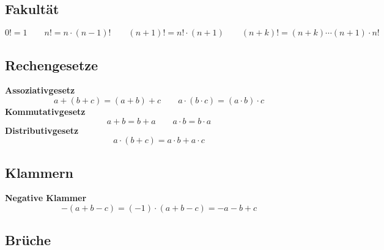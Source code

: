 \documentclass[../zusammenfassung_AN.tex]{subfiles}
\begin{document}
	
	\subsection{Fakultät}
	
	\begin{tcolorbox}[formelbox]
		\[
		0! = 1 \qquad
		n! = n\cdot(n-1)! \qquad
		(n+1)! = n!\cdot(n+1) \qquad
		(n+k)! = (n+k)\cdots(n+1)\cdot n!
		\]
	\end{tcolorbox}
	
	\subsection{Rechengesetze}
	
	\begin{tcolorbox}[dglbox, title={Grundgesetze der Arithmetik}]
		\textbf{Assoziativgesetz}
		\[
		a+(b+c) = (a+b)+c \qquad a\cdot(b\cdot c) = (a\cdot b)\cdot c
		\]
		\textbf{Kommutativgesetz}
		\[
		a+b = b+a \qquad a\cdot b = b\cdot a
		\]
		\textbf{Distributivgesetz}
		\[
		a\cdot(b+c) = a\cdot b + a\cdot c
		\]
	\end{tcolorbox}
	
	\subsection{Klammern}
	
	\begin{tcolorbox}[formelbox]
		\textbf{Negative Klammer}
		\[
		-(a+b-c) = (-1)\cdot(a+b-c) = -a - b + c
		\]
	\end{tcolorbox}
	
	\subsection{Brüche}
	
\end{document}
